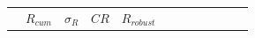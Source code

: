 \documentclass[pdflatex,sn-mathphys-num]{sn-jnl}%
\theoremstyle{thmstyleone}%
\theoremstyle{thmstyletwo}%
\theoremstyle{thmstylethree}%
\begin{document}
\begin{table}[h!]
\begin{tabular}{p{0.5cm}|p{1cm}|p{0.4cm}p{0.3cm}p{0.3cm}p{0.85cm}|p{0.4cm}p{0.4cm}p{0.55cm}|p{0.8cm}p{0.8cm}p{0.8cm}}
        
        
        
        
        
        
        
        
        
        
        
        
        
        
        
        
        
        
        
        
        
        
        
        
        
        
        
        
        
        
        
        
        
        
        
        
        
        
        
        
        
        
        
        
        
        
        
        
        
        
        
        
        
        
        
        
        
        
        
        
        
        
        
        
        
        
        
        
                      & $R_{cum}$       & $\sigma_R$   & $CR$       & $R_{robust}$

        
        
        
        
        
        
        
        
        
        
        
        
        
        
        
        
        
        

\end{tabular}
\end{table}
\end{document}
